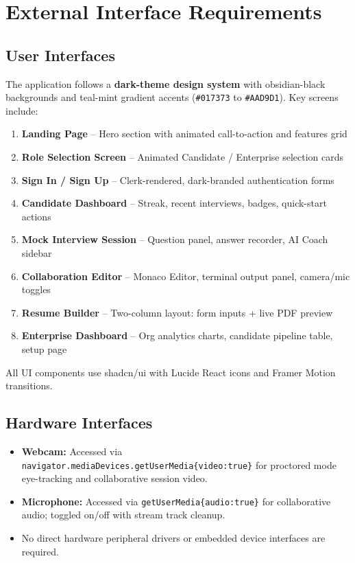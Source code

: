\documentclass{fisatinternship}
\begin{document}
\chapter{External Interface Requirements}

\section{User Interfaces}
The application follows a \textbf{dark-theme design system} with obsidian-black backgrounds
and teal-mint gradient accents (\texttt{\#017373} to \texttt{\#AAD9D1}).
Key screens include:
\begin{enumerate}
  \item \textbf{Landing Page} -- Hero section with animated call-to-action and features grid
  \item \textbf{Role Selection Screen} -- Animated Candidate / Enterprise selection cards
  \item \textbf{Sign In / Sign Up} -- Clerk-rendered, dark-branded authentication forms
  \item \textbf{Candidate Dashboard} -- Streak, recent interviews, badges, quick-start actions
  \item \textbf{Mock Interview Session} -- Question panel, answer recorder, AI Coach sidebar
  \item \textbf{Collaboration Editor} -- Monaco Editor, terminal output panel, camera/mic toggles
  \item \textbf{Resume Builder} -- Two-column layout: form inputs + live PDF preview
  \item \textbf{Enterprise Dashboard} -- Org analytics charts, candidate pipeline table, setup page
\end{enumerate}
All UI components use shadcn/ui with Lucide React icons and Framer Motion transitions.

\section{Hardware Interfaces}
\begin{itemize}
  \item \textbf{Webcam:} Accessed via \texttt{navigator.mediaDevices.getUserMedia\{video:true\}}
        for proctored mode eye-tracking and collaborative session video.
  \item \textbf{Microphone:} Accessed via \texttt{getUserMedia\{audio:true\}} for collaborative
        audio; toggled on/off with stream track cleanup.
  \item No direct hardware peripheral drivers or embedded device interfaces are required.
\end{itemize}
\end{document}
